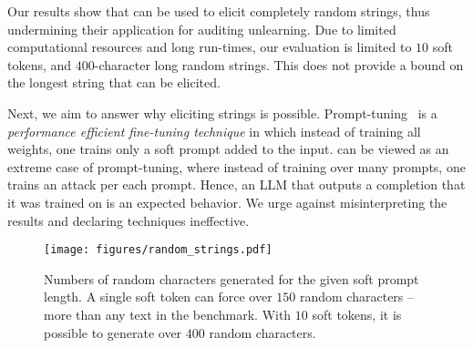 Our results show that  can be used to elicit completely random strings, thus undermining their application for auditing unlearning.
Due to limited computational resources and long run-times, our evaluation is limited to $10$ soft tokens, and $400$-character long random strings.
This does not provide a bound on the longest string that can be elicited.

Next, we aim to answer why eliciting strings is possible.
Prompt-tuning~\cite{lester2021prompttuning} is a \emph{performance efficient fine-tuning technique} in which instead of training all weights, one trains only a soft prompt added to the input.
 can be viewed as an extreme case of prompt-tuning, where instead of training over many prompts, one trains an attack per each prompt.
Hence, an LLM that outputs a completion that it was trained on is an expected behavior. 
We urge against misinterpreting the results and declaring techniques ineffective.

\begin{figure}[t]
    \texttt{[image: figures/random\_strings.pdf]}
    \caption{Numbers of random characters generated for the given soft prompt length. A single soft token can force over $150$ random characters -- more than any text in the \tofu benchmark. With $10$ soft tokens, it is possible to generate over $400$ random characters.}
    \label{fig:random_strings}
\end{figure}